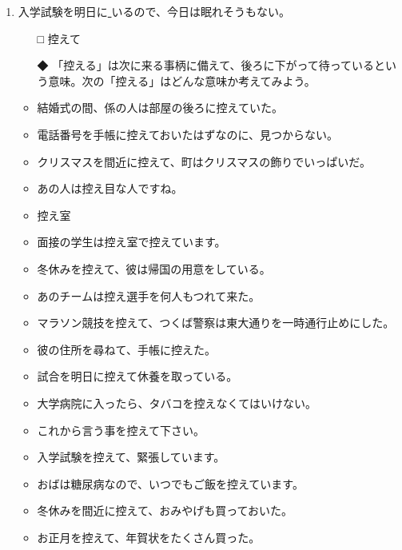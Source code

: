 \documentclass[
uplatex,
b5paper,
10pt,
dvipdfmx
]{jsbook}
\begin{document}
\begin{enumerate}
\item 入学試験を明日に\underline{    }いるので、今日は眠れそうもない。
\begin{itemize}
\item[□] 控えて
\item[◆] 「控える」は次に来る事柄に備えて、後ろに下がって待っているとい
	  う意味。次の「控える」はどんな意味か考えてみよう。
\end{itemize}
\begin{itemize}
\item 結婚式の間、係の人は部屋の後ろに控えていた。
\item 電話番号を手帳に控えておいたはずなのに、見つからない。
\item クリスマスを間近に控えて、町はクリスマスの飾りでいっぱいだ。
\item あの人は控え目な人ですね。
\item 控え室
\item 面接の学生は控え室で控えています。
\item 冬休みを控えて、彼は帰国の用意をしている。
\item あのチームは控え選手を何人もつれて来た。
\item マラソン競技を控えて、つくば警察は東大通りを一時通行止めにした。
\item 彼の住所を尋ねて、手帳に控えた。
\item 試合を明日に控えて休養を取っている。
\item 大学病院に入ったら、タバコを控えなくてはいけない。
\item これから言う事を控えて下さい。
\item 入学試験を控えて、緊張しています。
\item おばは糖尿病なので、いつでもご飯を控えています。
\item 冬休みを間近に控えて、おみやげも買っておいた。
\item お正月を控えて、年賀状をたくさん買った。
\end{itemize}


\end{enumerate}
\end{document}
